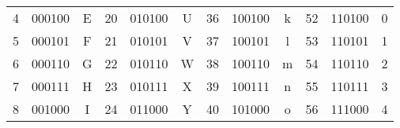 \documentclass[a4paper,11pt]{article}
\begin{document}
\begin{table}[h]
\begin{tabular}{ccc|ccc|ccc|ccc}
		\rowcolor[HTML]{F8F9FA}
		{\color[HTML]{202122} 4}              & {\color[HTML]{202122} 000100}          & {\color[HTML]{202122} E}             & {\color[HTML]{202122} 20}             & {\color[HTML]{202122} 010100}          & {\color[HTML]{202122} U}             & {\color[HTML]{202122} 36}             & {\color[HTML]{202122} 100100}          & {\color[HTML]{202122} k}             & {\color[HTML]{202122} 52}             & {\color[HTML]{202122} 110100}          & {\color[HTML]{202122} 0}             \\
		\rowcolor[HTML]{F8F9FA}
		{\color[HTML]{202122} 5}              & {\color[HTML]{202122} 000101}          & {\color[HTML]{202122} F}             & {\color[HTML]{202122} 21}             & {\color[HTML]{202122} 010101}          & {\color[HTML]{202122} V}             & {\color[HTML]{202122} 37}             & {\color[HTML]{202122} 100101}          & {\color[HTML]{202122} l}             & {\color[HTML]{202122} 53}             & {\color[HTML]{202122} 110101}          & {\color[HTML]{202122} 1}             \\
		\rowcolor[HTML]{F8F9FA}
		{\color[HTML]{202122} 6}              & {\color[HTML]{202122} 000110}          & {\color[HTML]{202122} G}             & {\color[HTML]{202122} 22}             & {\color[HTML]{202122} 010110}          & {\color[HTML]{202122} W}             & {\color[HTML]{202122} 38}             & {\color[HTML]{202122} 100110}          & {\color[HTML]{202122} m}             & {\color[HTML]{202122} 54}             & {\color[HTML]{202122} 110110}          & {\color[HTML]{202122} 2}             \\
		\rowcolor[HTML]{F8F9FA}
		{\color[HTML]{202122} 7}              & {\color[HTML]{202122} 000111}          & {\color[HTML]{202122} H}             & {\color[HTML]{202122} 23}             & {\color[HTML]{202122} 010111}          & {\color[HTML]{202122} X}             & {\color[HTML]{202122} 39}             & {\color[HTML]{202122} 100111}          & {\color[HTML]{202122} n}             & {\color[HTML]{202122} 55}             & {\color[HTML]{202122} 110111}          & {\color[HTML]{202122} 3}             \\
		\rowcolor[HTML]{F8F9FA}
		{\color[HTML]{202122} 8}              & {\color[HTML]{202122} 001000}          & {\color[HTML]{202122} I}             & {\color[HTML]{202122} 24}             & {\color[HTML]{202122} 011000}          & {\color[HTML]{202122} Y}             & {\color[HTML]{202122} 40}             & {\color[HTML]{202122} 101000}          & {\color[HTML]{202122} o}             & {\color[HTML]{202122} 56}             & {\color[HTML]{202122} 111000}          & {\color[HTML]{202122} 4}             \\

\end{tabular}
\end{table}
\end{document}
